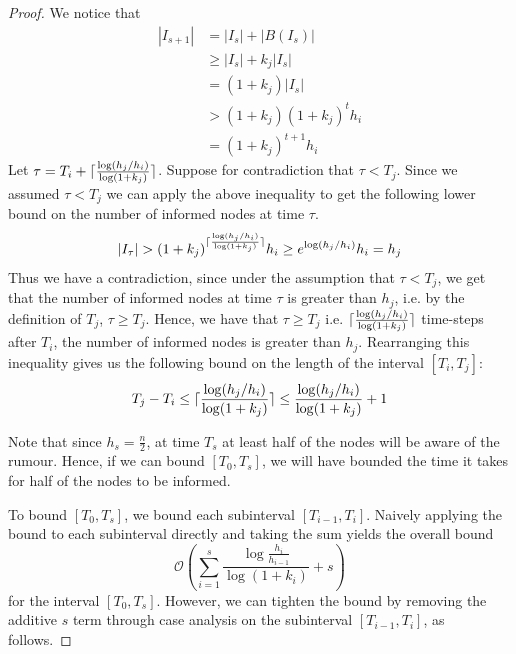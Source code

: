 \begin{proof}
	We notice that 
	\begin{align*}
		|I_{s+1}| &= |I_s| + |B(I_s)| \\ %
		& \geq |I_s| + k_j |I_s| \\ %
		& = (1 + k_j)|I_s| \\
		& > (1 + k_j)(1+k_j)^t h_i \\ %
		& = (1+k_j)^{t+1} h_i
	\end{align*}
	Let $\tau = T_i + \lceil \frac{\log (h_j/h_i)}{\log(1+k_j)}\rceil$. 
	Suppose for contradiction that $\tau < T_j$. %
	Since we assumed $\tau < T_j$ we can apply the above inequality %
	to get the following lower bound on the number of informed nodes at time $\tau$.
	$$
		|I_\tau| > 
		(1+k_j)^{\lceil \frac{\log (h_j/h_i)}{\log(1+k_j)}\rceil} h_i
		\geq e^{\log (h_j/h_i)} h_i
		= h_j
	$$
	Thus we have a contradiction, since under the assumption that $\tau < T_j$, we get that the number of informed nodes at time $\tau$ is greater than $h_j$, i.e. by the definition of $T_j$, $\tau \geq T_j$. Hence, we have that $\tau \geq T_j$ i.e. $\lceil \frac{\log (h_j/h_i)}{\log(1+k_j)}\rceil$ time-steps after $T_i$, the number of informed nodes is greater than $h_j$. Rearranging this inequality gives us the following bound on the length of the interval $[T_i, T_j]$:
	\begin{equation} \label{eq:FloodingIntervalBound}
		T_j - T_i \leq \lceil \frac{\log (h_j/h_i)}{\log(1+k_j)}\rceil \leq \frac{\log (h_j/h_i)}{\log(1+k_j)} + 1
	\end{equation}

	Note that since $h_s = \frac{n}{2}$, at time $T_s$ at least half of the nodes will be aware of the rumour. Hence, if we can bound $[T_0, T_s]$, we will have bounded the time it takes for half of the nodes to be informed. 

	To bound $[T_0, T_s]$, we bound each subinterval $[T_{i-1}, T_i]$. Naively applying the bound to each subinterval directly and taking the sum yields the overall bound 
	$$
		\mathcal{O}\left(\sum_{i=1}^s \frac{\log \frac{h_i}{h_{i-1}}}{\log(1+k_i)} + s\right)
	$$ 
	for the interval $[T_0,T_s]$. However, we can tighten the bound by removing the additive $s$ term through case analysis on the subinterval $[T_{i-1}, T_i]$, as follows.


\end{proof}
